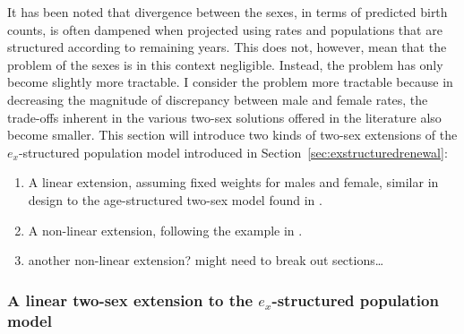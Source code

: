 \label{sec:exLotka2linear}
It has been noted that divergence between the sexes, in terms of predicted birth
counts, is often dampened when projected using rates and populations that are
structured according to remaining years. This does not, however, mean that the
problem of the sexes is in this context negligible. Instead, the problem has
only become slightly more tractable. I consider the problem more tractable
because in decreasing the magnitude of discrepancy between male and female
rates, the trade-offs inherent in the various two-sex solutions offered in the
literature also become smaller. This section will introduce two kinds of two-sex
extensions of the $e_x$-structured population model introduced in
Section~\ref{sec:exstructuredrenewal}:
\begin{enumerate}
  \item A linear extension, assuming fixed weights for males and female,
  similar in design to the age-structured two-sex model found in
  \citet{goodman1967age}.
  \item A non-linear extension, following the example in
  \citet{gupta1978alternative}.
  \item another non-linear extension? might need to break out sections\ldots
\end{enumerate}

\subsubsection{A linear two-sex extension to the $e_x$-structured population
model} 

